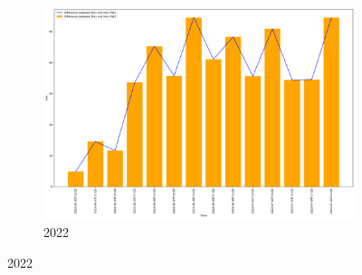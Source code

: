 \begin{figure}[h]
\begin{subfigure}{0.45\textwidth}
	\end{subfigure}
	\hfill
	\begin{subfigure}{0.45\textwidth}
		\centering
		\includegraphics[width=\textwidth]{graphs/2022/FWIX_DIFFmaxMin.png}
		\caption{2022}
	\end{subfigure}
	\label{fig:daily_fwi_dif_maxmin}
\end{figure}

